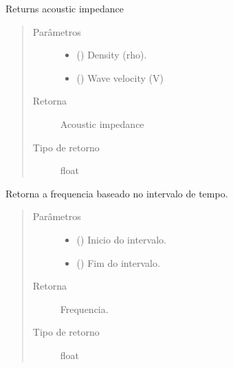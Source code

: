 \documentclass[letterpaper,10pt,brazil]{sphinxmanual}
\begin{document}

\begin{fulllineitems}
\label{\detokenize{source/base:base.acoustic_impedance}}
Returns acoustic impedance
\begin{quote}\begin{description}
\item[{Parâmetros}] \leavevmode\begin{itemize}
\item {} 
 () \textendash{} Density (rho).

\item {} 
 () \textendash{} Wave velocity (V)

\end{itemize}

\item[{Retorna}] \leavevmode
Acoustic impedance

\item[{Tipo de retorno}] \leavevmode
float

\end{description}\end{quote}

\end{fulllineitems}


\begin{fulllineitems}
\label{\detokenize{source/base:base.frequency}}
Retorna a frequencia baseado no intervalo de tempo.
\begin{quote}\begin{description}
\item[{Parâmetros}] \leavevmode\begin{itemize}
\item {} 
 () \textendash{} Inicio do intervalo.

\item {} 
 () \textendash{} Fim do intervalo.

\end{itemize}

\item[{Retorna}] \leavevmode
Frequencia.

\item[{Tipo de retorno}] \leavevmode
float

\end{description}\end{quote}

\end{fulllineitems}
\end{document}
